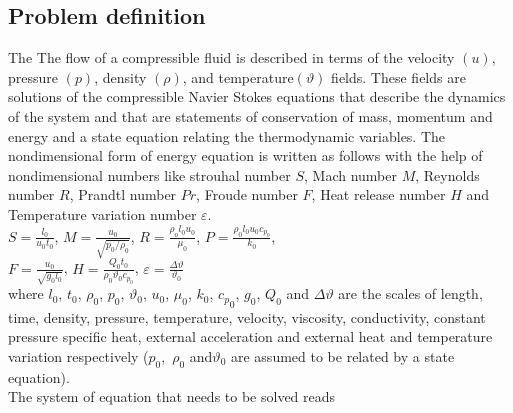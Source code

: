 \documentclass[11pt,a4paper]{article}
\begin{document}
\subsection{Problem definition}
The The flow of a compressible fluid is described in terms of the velocity $(u)$, pressure $(p)$, density $(\rho)$, and temperature$(\vartheta)$ fields. These fields are solutions of the compressible Navier Stokes equations that describe the dynamics of the system
and that are statements of conservation of mass, momentum and energy and a state equation relating the thermodynamic variables. The nondimensional form of energy equation is written as follows with the help of nondimensional numbers like strouhal number $S$, Mach number $M$, Reynolds number $R$, Prandtl number $Pr$, Froude number $F$, Heat release number $H$ and Temperature variation number $\varepsilon$. \\
$S=\frac{l_0}{u_0t_0}$,  $M=\frac{u_0}{\sqrt{p_0/\rho_0}}$, $R=\frac{\rho_ol_0u_0}{\mu_0}$, $P=\frac{\rho_0l_0u_0c_{p_0}}{k_0}$, \\ $F=\frac{u_0}{\sqrt{g_0l_0}}$, $H=\frac{Q_0t_0}{\rho_0\vartheta_0c_{p_0}}$, $\varepsilon=\frac{{\Delta}\vartheta}{\vartheta_0}$\\
where $l_0$, $t_0$, $\rho_0$, $p_0$, $\vartheta_0$, $u_0$, $\mu_0$, $k_0$, ${c_p}_0$, $g_0$, $Q_0$ and $\Delta\vartheta$ are the scales of length,
time, density, pressure, temperature, velocity, viscosity, conductivity, constant
pressure specific heat, external acceleration and external heat and temperature
variation respectively ($p_0,$ $\rho_0$ and$ \vartheta_0$ are assumed to be related by a state
equation).\\
The system of equation that needs to be solved reads
\end{document}
